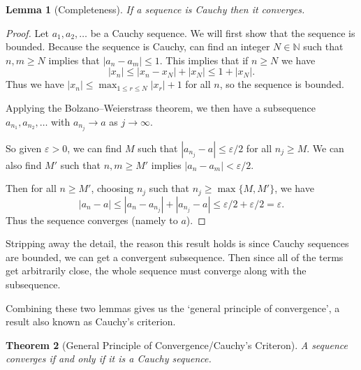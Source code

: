 \documentclass[11pt, a4paper]{article}
\newtheorem{theorem}{Theorem}[section]
\newtheorem{lemma}[theorem]{Lemma}
\theoremstyle{definition}
\newcommand{\N}{\mathbb{N}}
\begin{document}
\begin{lemma}[Completeness]
	If a sequence is Cauchy then it converges.
\end{lemma}
\begin{proof}
	Let $a_1, a_2, \dots$ be a Cauchy sequence. We will first show that the sequence is bounded. 
	Because the sequence is Cauchy, can find an integer $N \in \N$ such that $n, m \geq N$ implies that $|a_n - a_m| \leq 1$.
	This implies that if $n \geq N$ we have
	$$
		|x_n| \leq |x_n - x_{N}| + |x_{N}| \leq 1 + |x_{N}|.
	$$
	Thus we have $\displaystyle |x_n| \leq \max_{1 \leq r \leq N} |x_r| + 1$ for all $n$, so the sequence is bounded.

	Applying the Bolzano–Weierstrass theorem, we then have a subsequence $a_{n_1}, a_{n_2}, \dots$ with $a_{n_j} \rightarrow a$ as $j \rightarrow \infty$. 
	
	So given $\varepsilon > 0$, we can find $M$ such that $|a_{n_j} - a| \leq \varepsilon/2$ for all $n_j \geq M$. We can also find $M'$ such that $n, m \geq M'$ implies $|a_n - a_{m}| < \varepsilon/2$. 
	
	Then for all $n \geq M'$, choosing $n_j$ such that $n_j \geq \max\{M, M'\}$, we have
	$$
		|a_n - a| \leq |a_n - a_{n_j}| + |a_{n_j} - a| \leq \varepsilon/2 + \varepsilon/2 = \varepsilon.
	$$
	Thus the sequence converges (namely to $a$).
\end{proof}

Stripping away the detail, the reason this result holds is since Cauchy sequences are bounded, we can get a convergent subsequence. Then since all of the terms get arbitrarily close, the whole sequence must converge along with the subsequence.

Combining these two lemmas gives us the `general principle of convergence', a result also known as Cauchy's criterion.

\begin{theorem}[General Principle of Convergence/Cauchy's Criteron]
	A sequence converges if and only if it is a Cauchy sequence.
\end{theorem}
\end{document}
